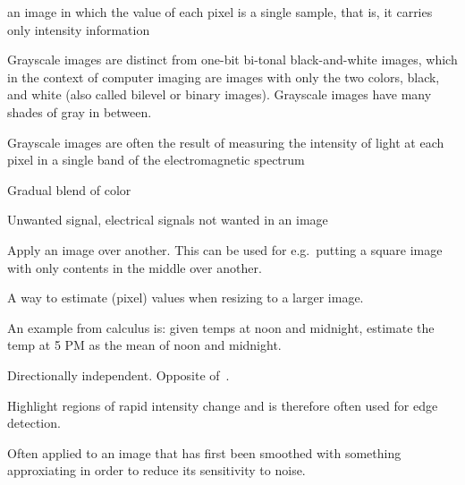 \begin{definition}[Grayscale]
    an image in which the value of each pixel is a single sample, that is, it
    carries only intensity information

    Grayscale images are distinct from one-bit bi-tonal black-and-white images,
    which in the context of computer imaging are images with only the two
    colors, black, and white (also called bilevel or binary images). Grayscale
    images have many shades of gray in between.

    Grayscale images are often the result of measuring the intensity of light
    at each pixel in a single band of the electromagnetic spectrum 

\end{definition}

\begin{definition}
    Gradual blend of color
\end{definition}

\begin{definition}
    Unwanted signal, electrical signals not wanted in an image
\end{definition}

\begin{definition}
    Apply an image over another. This can be used for e.g.\ putting a square image
    with only contents in the middle over another.
\end{definition}

\begin{definition}[Interpolation]
    A way to estimate (pixel) values when resizing to a larger image.

    An example from calculus is: given temps at noon and midnight, estimate
    the temp at 5 PM as the mean of noon and midnight.

\end{definition}

\begin{definition}[Isotropy]\label{isotropy}
    Directionally independent. Opposite of~.
\end{definition}

\begin{definition}[Laplacian]
    Highlight regions of rapid intensity change and is therefore often used for
    edge detection.

    Often applied to an image that has first been smoothed with something
    approxiating in order to reduce its sensitivity to noise.

\end{definition}


